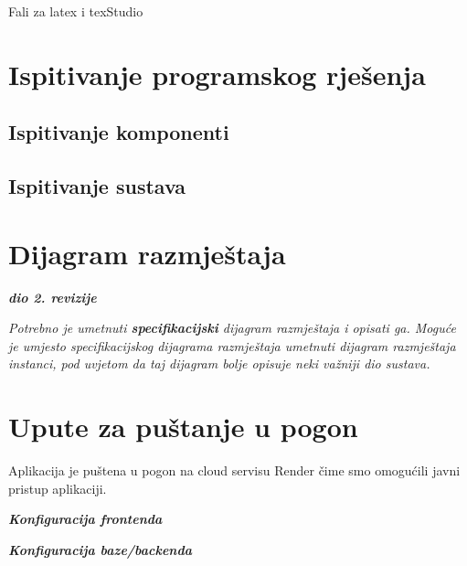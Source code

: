 			 Fali za latex i texStudio
			
			\eject 
		
	
		\section{Ispitivanje programskog rješenja}
			
			\subsection{Ispitivanje komponenti}
		
			\subsection{Ispitivanje sustava}
			
			\eject 
		
		
		\section{Dijagram razmještaja}
			
			\textbf{\textit{dio 2. revizije}}
			
			 \textit{Potrebno je umetnuti \textbf{specifikacijski} dijagram razmještaja i opisati ga. Moguće je umjesto specifikacijskog dijagrama razmještaja umetnuti dijagram razmještaja instanci, pod uvjetom da taj dijagram bolje opisuje neki važniji dio sustava.}
			
			\eject 
		
		\section{Upute za puštanje u pogon}
		
			Aplikacija je puštena u pogon na cloud servisu Render čime smo omogućili javni pristup aplikaciji.
			
			\textbf{\textit{Konfiguracija frontenda}}
			
			\textbf{\textit{Konfiguracija baze/backenda}}
			
			
			\eject 